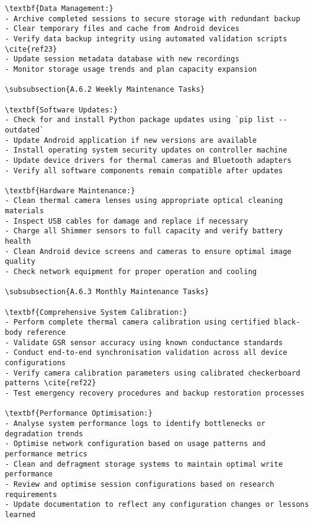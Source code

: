 \begin{verbatim}
\textbf{Data Management:}
- Archive completed sessions to secure storage with redundant backup
- Clear temporary files and cache from Android devices
- Verify data backup integrity using automated validation scripts \cite{ref23}
- Update session metadata database with new recordings
- Monitor storage usage trends and plan capacity expansion

\subsubsection{A.6.2 Weekly Maintenance Tasks}

\textbf{Software Updates:}
- Check for and install Python package updates using `pip list --outdated`
- Update Android application if new versions are available
- Install operating system security updates on controller machine
- Update device drivers for thermal cameras and Bluetooth adapters
- Verify all software components remain compatible after updates

\textbf{Hardware Maintenance:}
- Clean thermal camera lenses using appropriate optical cleaning materials
- Inspect USB cables for damage and replace if necessary
- Charge all Shimmer sensors to full capacity and verify battery health
- Clean Android device screens and cameras to ensure optimal image quality
- Check network equipment for proper operation and cooling

\subsubsection{A.6.3 Monthly Maintenance Tasks}

\textbf{Comprehensive System Calibration:}
- Perform complete thermal camera calibration using certified black-body reference
- Validate GSR sensor accuracy using known conductance standards
- Conduct end-to-end synchronisation validation across all device configurations
- Verify camera calibration parameters using calibrated checkerboard patterns \cite{ref22}
- Test emergency recovery procedures and backup restoration processes

\textbf{Performance Optimisation:}
- Analyse system performance logs to identify bottlenecks or degradation trends
- Optimise network configuration based on usage patterns and performance metrics
- Clean and defragment storage systems to maintain optimal write performance
- Review and optimise session configurations based on research requirements
- Update documentation to reflect any configuration changes or lessons learned


\end{verbatim}
